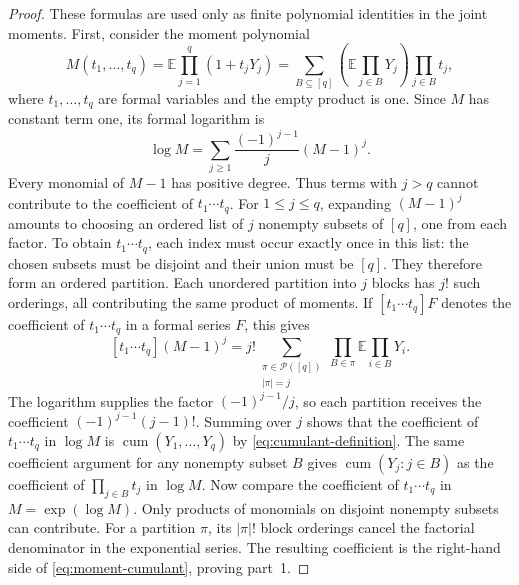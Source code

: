 \documentclass[11pt]{article}
\theoremstyle{definition}
\theoremstyle{remark}
\theoremstyle{plain}
\newcommand{\E}{\mathbb E}
\DeclareMathOperator{\cum}{cum}
\begin{document}
\begin{proof}
These formulas are used only as finite polynomial identities in the
joint moments. First, consider the moment polynomial
\[
 M(t_1,\ldots,t_q)
    =\E\prod_{j=1}^q(1+t_jY_j)
    =\sum_{B\subseteq[q]}\left(\E\prod_{j\in B}Y_j\right)
                         \prod_{j\in B}t_j,
\]
where $t_1,\ldots,t_q$ are formal variables and the empty product
is one. Since $M$ has constant term one, its formal logarithm is
\[
 \log M=\sum_{j\ge1}\frac{(-1)^{j-1}}{j}(M-1)^j.
\]
Every monomial of $M-1$ has positive degree. Thus terms with
$j>q$ cannot contribute to the coefficient of $t_1\cdots t_q$.
For $1\le j\le q$, expanding $(M-1)^j$ amounts to choosing
an ordered list of $j$ nonempty subsets of $[q]$, one from each
factor. To obtain $t_1\cdots t_q$, each index must occur exactly
once in this list: the chosen subsets must be disjoint and their
union must be $[q]$. They therefore form an ordered partition.
Each unordered partition into $j$ blocks has $j!$ such orderings,
all contributing the same product of moments. If
$[t_1\cdots t_q]F$ denotes the coefficient of $t_1\cdots t_q$
in a formal series $F$, this gives
\[
 [t_1\cdots t_q](M-1)^j
   =j!\sum_{\substack{\pi\in\mathcal P([q])\\|\pi|=j}}
          \prod_{B\in\pi}\E\prod_{i\in B}Y_i.
\]
The logarithm supplies the factor $(-1)^{j-1}/j$, so each
partition receives the coefficient $(-1)^{j-1}(j-1)!$.
Summing over $j$ shows that the coefficient of $t_1\cdots t_q$
in $\log M$ is $\cum(Y_1,\ldots,Y_q)$ by
\eqref{eq:cumulant-definition}.
The same coefficient argument for any nonempty subset $B$ gives
$\cum(Y_j:j\in B)$ as the coefficient of $\prod_{j\in B}t_j$
in $\log M$. Now compare the coefficient of $t_1\cdots t_q$
in $M=\exp(\log M)$. Only products of monomials on disjoint
nonempty subsets can contribute. For a partition $\pi$, its
$|\pi|!$ block orderings cancel the factorial denominator in
the exponential series. The resulting coefficient is the
right-hand side of \eqref{eq:moment-cumulant}, proving part~1.


\end{proof}
\end{document}
